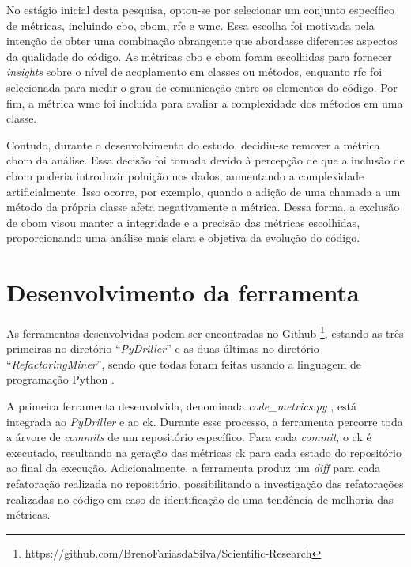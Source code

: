 No estágio inicial desta pesquisa, optou-se por selecionar um conjunto específico de métricas, incluindo \gls{cbo}, \gls{cbom}, \gls{rfc} e \gls{wmc}. Essa escolha foi motivada pela intenção de obter uma combinação abrangente que abordasse diferentes aspectos da qualidade do código. As métricas \gls{cbo} e \gls{cbom} foram escolhidas para fornecer \textit{insights} sobre o nível de acoplamento em classes ou métodos, enquanto \gls{rfc} foi selecionada para medir o grau de comunicação entre os elementos do código. Por fim, a métrica \gls{wmc} foi incluída para avaliar a complexidade dos métodos em uma classe.

Contudo, durante o desenvolvimento do estudo, decidiu-se remover a métrica \gls{cbom} da análise. Essa decisão foi tomada devido à percepção de que a inclusão de \gls{cbom} poderia introduzir poluição nos dados, aumentando a complexidade artificialmente. Isso ocorre, por exemplo, quando a adição de uma chamada a um método da própria classe afeta negativamente a métrica. Dessa forma, a exclusão de \gls{cbom} visou manter a integridade e a precisão das métricas escolhidas, proporcionando uma análise mais clara e objetiva da evolução do código.

\section{Desenvolvimento da ferramenta}

As ferramentas desenvolvidas podem ser encontradas no Github \footnote{https://github.com/BrenoFariasdaSilva/Scientific-Research}, estando as três primeiras no diretório ``\textit{PyDriller}'' e as duas últimas no diretório ``\textit{RefactoringMiner}'', sendo que todas foram feitas usando a linguagem de programação Python \cite{PythonProgrammingLanguage}.

A primeira ferramenta desenvolvida, denominada \textit{code\_metrics.py} \cite{PyDriller:CodeMetrics:2023}, está integrada ao \textit{PyDriller} e ao \gls{ck}. Durante esse processo, a ferramenta percorre toda a árvore de \textit{commits} de um repositório específico. Para cada \textit{commit}, o \gls{ck} é executado, resultando na geração das métricas \gls{ck} para cada estado do repositório ao final da execução. Adicionalmente, a ferramenta produz um \textit{diff} para cada refatoração realizada no repositório, possibilitando a investigação das refatorações realizadas no código em caso de identificação de uma tendência de melhoria das métricas.

